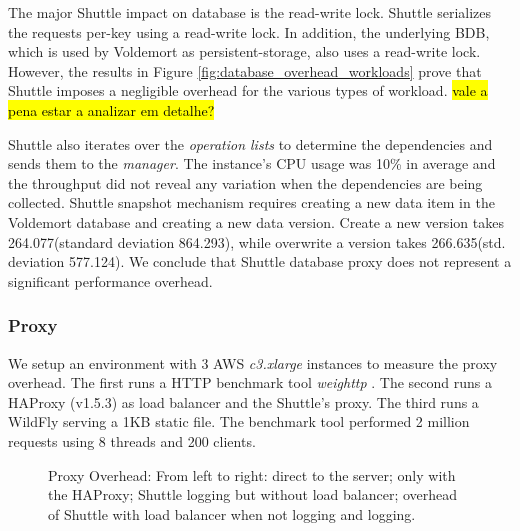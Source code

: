 The major Shuttle impact on database is the read-write lock. Shuttle serializes the requests per-key using a read-write lock. In addition, the underlying \acf{BDB}, which is used by Voldemort as persistent-storage, also uses a read-write lock. However, the results in Figure \ref{fig:database_overhead_workloads} prove that Shuttle imposes a negligible overhead for the various types of workload.  \hl{vale a pena estar a analizar em detalhe?}

Shuttle also iterates over the \emph{operation lists} to determine the dependencies and sends them to the \emph{manager}. The instance's CPU usage was 10\% in average and the throughput did not reveal any variation when the dependencies are being collected. Shuttle snapshot mechanism requires creating a new data item in the Voldemort database and creating a new data version. Create a new version takes 264.077\us (standard deviation 864.293\us), while overwrite a version takes 266.635\us (std. deviation 577.124\us).
We conclude that Shuttle database proxy does not represent a significant performance overhead. %


\subsubsection{Proxy}\label{sec:eval:performance:proxy}
We setup an environment with 3 \ac{AWS} \textit{c3.xlarge} instances to measure the proxy overhead. The first runs a \ac{HTTP} benchmark tool \emph{weighttp} \cite{weighttp}. The second runs a HAProxy (v1.5.3) as load balancer and the Shuttle's proxy. The third runs a WildFly serving a 1KB static file. The benchmark tool performed 2 million requests using 8 threads and 200 clients.

\begin{figure}[!htb]

  \caption[Proxy Overhead]{Proxy Overhead: From left to right: direct to the server; only with the HAProxy; Shuttle logging but without load balancer; overhead of Shuttle with load balancer when not logging and logging.}
  \label{fig:overhead_proxy}
\end{figure}

